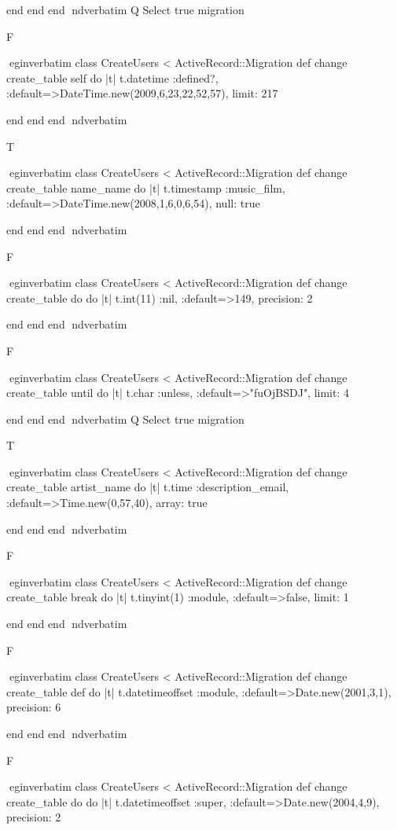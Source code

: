     end 
  end 
end
nd{verbatim}
Q
 Select true migration

F

egin{verbatim}
 class CreateUsers < ActiveRecord::Migration 
  def change 
    create_table self do |t| 
      t.datetime :defined?, :default=>DateTime.new(2009,6,23,22,52,57), limit: 217
    
    end 
  end 
end
nd{verbatim}

T

egin{verbatim}
 class CreateUsers < ActiveRecord::Migration 
  def change 
    create_table name_name do |t| 
      t.timestamp :music_film, :default=>DateTime.new(2008,1,6,0,6,54), null: true
    
    end 
  end 
end
nd{verbatim}

F

egin{verbatim}
 class CreateUsers < ActiveRecord::Migration 
  def change 
    create_table do do |t| 
      t.int(11) :nil, :default=>149, precision: 2
    
    end 
  end 
end
nd{verbatim}

F

egin{verbatim}
 class CreateUsers < ActiveRecord::Migration 
  def change 
    create_table until do |t| 
      t.char :unless, :default=>"fuOjBSDJ", limit: 4
    
    end 
  end 
end
nd{verbatim}
Q
 Select true migration

T

egin{verbatim}
 class CreateUsers < ActiveRecord::Migration 
  def change 
    create_table artist_name do |t| 
      t.time :description_email, :default=>Time.new(0,57,40), array: true
    
    end 
  end 
end
nd{verbatim}

F

egin{verbatim}
 class CreateUsers < ActiveRecord::Migration 
  def change 
    create_table break do |t| 
      t.tinyint(1) :module, :default=>false, limit: 1
    
    end 
  end 
end
nd{verbatim}

F

egin{verbatim}
 class CreateUsers < ActiveRecord::Migration 
  def change 
    create_table def do |t| 
      t.datetimeoffset :module, :default=>Date.new(2001,3,1), precision: 6
    
    end 
  end 
end
nd{verbatim}

F

egin{verbatim}
 class CreateUsers < ActiveRecord::Migration 
  def change 
    create_table do do |t| 
      t.datetimeoffset :super, :default=>Date.new(2004,4,9), precision: 2
    
